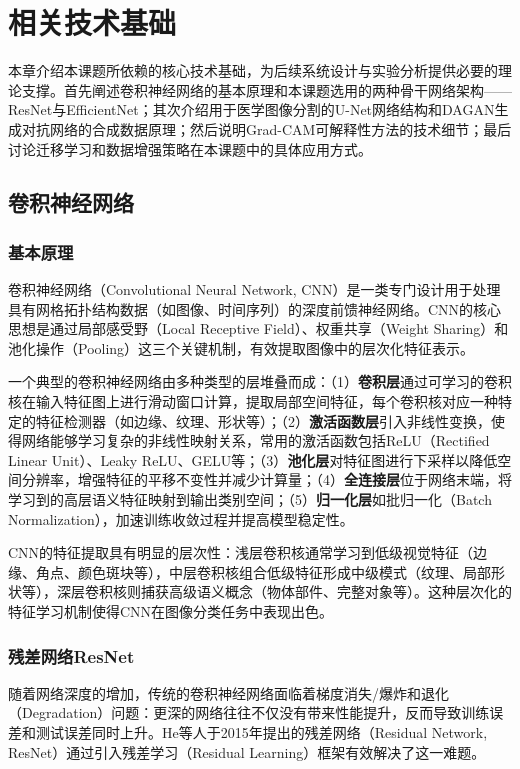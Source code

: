 \section{相关技术基础}

本章介绍本课题所依赖的核心技术基础，为后续系统设计与实验分析提供必要的理论支撑。首先阐述卷积神经网络的基本原理和本课题选用的两种骨干网络架构——ResNet与EfficientNet；其次介绍用于医学图像分割的U-Net网络结构和DAGAN生成对抗网络的合成数据原理；然后说明Grad-CAM可解释性方法的技术细节；最后讨论迁移学习和数据增强策略在本课题中的具体应用方式。


\subsection{卷积神经网络}

\subsubsection{基本原理}

卷积神经网络（Convolutional Neural Network, CNN）是一类专门设计用于处理具有网格拓扑结构数据（如图像、时间序列）的深度前馈神经网络。CNN的核心思想是通过局部感受野（Local Receptive Field）、权重共享（Weight Sharing）和池化操作（Pooling）这三个关键机制，有效提取图像中的层次化特征表示。

一个典型的卷积神经网络由多种类型的层堆叠而成：（1）\textbf{卷积层}通过可学习的卷积核在输入特征图上进行滑动窗口计算，提取局部空间特征，每个卷积核对应一种特定的特征检测器（如边缘、纹理、形状等）；（2）\textbf{激活函数层}引入非线性变换，使得网络能够学习复杂的非线性映射关系，常用的激活函数包括ReLU（Rectified Linear Unit）、Leaky ReLU、GELU等；（3）\textbf{池化层}对特征图进行下采样以降低空间分辨率，增强特征的平移不变性并减少计算量；（4）\textbf{全连接层}位于网络末端，将学习到的高层语义特征映射到输出类别空间；（5）\textbf{归一化层}如批归一化（Batch Normalization），加速训练收敛过程并提高模型稳定性。

CNN的特征提取具有明显的层次性：浅层卷积核通常学习到低级视觉特征（边缘、角点、颜色斑块等），中层卷积核组合低级特征形成中级模式（纹理、局部形状等），深层卷积核则捕获高级语义概念（物体部件、完整对象等）。这种层次化的特征学习机制使得CNN在图像分类任务中表现出色。

\subsubsection{残差网络ResNet}

随着网络深度的增加，传统的卷积神经网络面临着梯度消失/爆炸和退化（Degradation）问题：更深的网络往往不仅没有带来性能提升，反而导致训练误差和测试误差同时上升。He等人\cite{he2016deep}于2015年提出的残差网络（Residual Network, ResNet）通过引入残差学习（Residual Learning）框架有效解决了这一难题。

